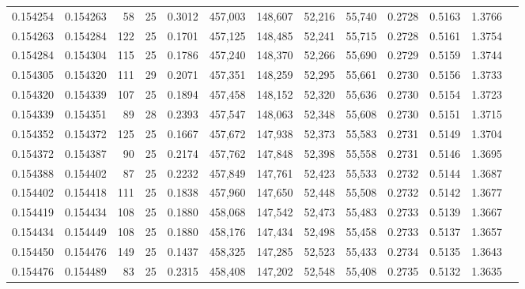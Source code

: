 \begin{tabular}{rrrrrrrrrrrrr}
0.154254 & 0.154263 &    58 &  25 &                                     0.3012 & 457,003 & 148,607 &  52,216 &  55,740 & 0.2728 & 0.5163 & 1.3766 \\
0.154263 & 0.154284 &   122 &  25 &                                     0.1701 & 457,125 & 148,485 &  52,241 &  55,715 & 0.2728 & 0.5161 & 1.3754 \\
0.154284 & 0.154304 &   115 &  25 &                                     0.1786 & 457,240 & 148,370 &  52,266 &  55,690 & 0.2729 & 0.5159 & 1.3744 \\
0.154305 & 0.154320 &   111 &  29 &                                     0.2071 & 457,351 & 148,259 &  52,295 &  55,661 & 0.2730 & 0.5156 & 1.3733 \\
0.154320 & 0.154339 &   107 &  25 &                                     0.1894 & 457,458 & 148,152 &  52,320 &  55,636 & 0.2730 & 0.5154 & 1.3723 \\
0.154339 & 0.154351 &    89 &  28 &                                     0.2393 & 457,547 & 148,063 &  52,348 &  55,608 & 0.2730 & 0.5151 & 1.3715 \\
0.154352 & 0.154372 &   125 &  25 &                                     0.1667 & 457,672 & 147,938 &  52,373 &  55,583 & 0.2731 & 0.5149 & 1.3704 \\
0.154372 & 0.154387 &    90 &  25 &                                     0.2174 & 457,762 & 147,848 &  52,398 &  55,558 & 0.2731 & 0.5146 & 1.3695 \\
0.154388 & 0.154402 &    87 &  25 &                                     0.2232 & 457,849 & 147,761 &  52,423 &  55,533 & 0.2732 & 0.5144 & 1.3687 \\
0.154402 & 0.154418 &   111 &  25 &                                     0.1838 & 457,960 & 147,650 &  52,448 &  55,508 & 0.2732 & 0.5142 & 1.3677 \\
0.154419 & 0.154434 &   108 &  25 &                                     0.1880 & 458,068 & 147,542 &  52,473 &  55,483 & 0.2733 & 0.5139 & 1.3667 \\
0.154434 & 0.154449 &   108 &  25 &                                     0.1880 & 458,176 & 147,434 &  52,498 &  55,458 & 0.2733 & 0.5137 & 1.3657 \\
0.154450 & 0.154476 &   149 &  25 &                                     0.1437 & 458,325 & 147,285 &  52,523 &  55,433 & 0.2734 & 0.5135 & 1.3643 \\
0.154476 & 0.154489 &    83 &  25 &                                     0.2315 & 458,408 & 147,202 &  52,548 &  55,408 & 0.2735 & 0.5132 & 1.3635 \\

\end{tabular}

